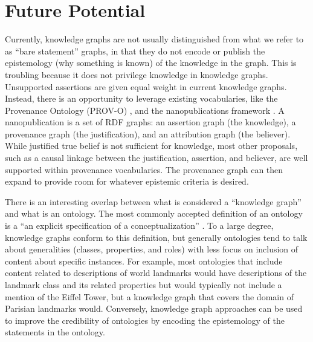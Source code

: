 \section{Future Potential}

Currently, knowledge graphs are not usually distinguished from what we refer to as ``bare statement'' graphs, in that they do not encode or publish the epistemology (why something is known) of the knowledge in the graph.
This is troubling because it does not privilege knowledge in knowledge graphs.
Unsupported assertions are given equal weight in current knowledge graphs.
Instead, there is an opportunity to leverage existing vocabularies, like the Provenance Ontology (PROV-O) \cite{Moreau_2015}, and the nanopublications framework \cite{groth2010anatomy}.
A nanopublication is a set of RDF graphs: an assertion graph (the knowledge), a provenance graph (the justification), and an attribution graph (the believer).
While justified true belief is not sufficient for knowledge, most other proposals, such as a causal linkage between the justification, assertion, and believer, are well supported within provenance vocabularies.
The provenance graph can then expand to provide room for whatever epistemic criteria is desired.

There is an interesting overlap between what is considered a ``knowledge graph'' and what is an ontology.
The most commonly accepted definition of an ontology is a ``an explicit specification of a conceptualization'' \cite{Gruber_1993}.
To a large degree, knowledge graphs conform to this definition, but generally ontologies tend to talk about generalities (classes, properties, and roles) with less focus on inclusion of content about specific instances.
For example, most ontologies that include content related to descriptions of world landmarks would have descriptions of the landmark class and its related properties but would typically not include a mention of the Eiffel Tower, but a knowledge graph that covers the domain of Parisian landmarks would.
Conversely, knowledge graph approaches can be used to improve the credibility of ontologies by encoding the epistemology of the statements in the ontology.
